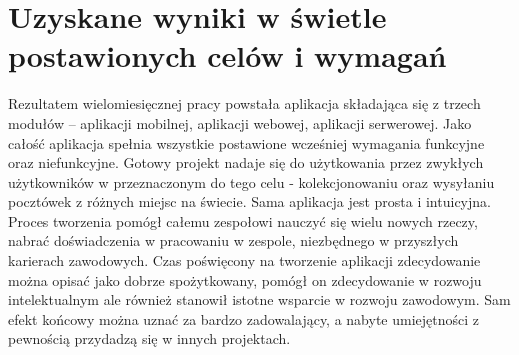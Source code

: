 \documentclass[a4paper,twoside,12pt]{book}
\begin{document}
\section{Uzyskane wyniki w świetle postawionych celów i wymagań}
Rezultatem wielomiesięcznej pracy powstała aplikacja składająca się z trzech modułów -- aplikacji mobilnej, aplikacji webowej, aplikacji serwerowej. Jako całość aplikacja spełnia wszystkie postawione wcześniej wymagania funkcyjne oraz niefunkcyjne.
Gotowy projekt nadaje się do użytkowania przez zwykłych użytkowników w przeznaczonym do tego celu - kolekcjonowaniu oraz wysyłaniu pocztówek z różnych miejsc na świecie. Sama aplikacja jest prosta i intuicyjna.
Proces tworzenia pomógł całemu zespołowi nauczyć się wielu nowych rzeczy, nabrać doświadczenia w pracowaniu w zespole, niezbędnego w przyszłych karierach zawodowych. Czas poświęcony na tworzenie aplikacji zdecydowanie można opisać jako dobrze spożytkowany, pomógł on zdecydowanie w rozwoju intelektualnym ale również stanowił istotne wsparcie w rozwoju zawodowym. Sam efekt końcowy można uznać za bardzo zadowalający, a nabyte umiejętności z pewnością przydadzą się w innych projektach.






\backmatter

\printbibliography           %
\end{document}
